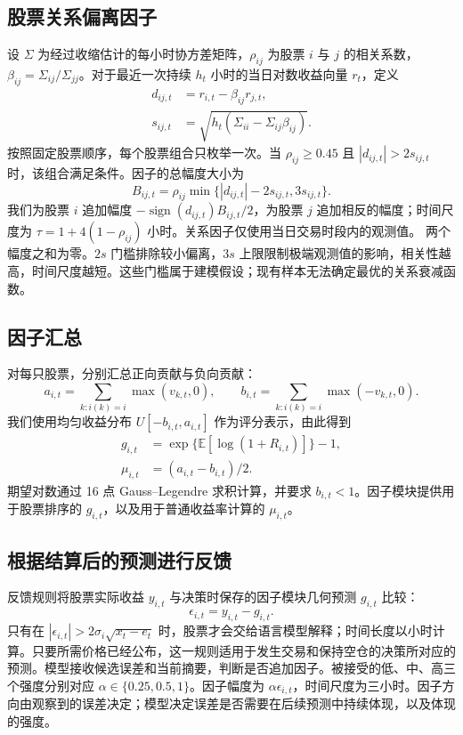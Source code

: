 \documentclass[conference]{IEEEtran}
\begin{document}
\subsection{股票关系偏离因子}
设 $\Sigma$ 为经过收缩估计的每小时协方差矩阵，$\rho_{ij}$ 为股票 $i$ 与 $j$ 的相关系数，$\beta_{ij}=\Sigma_{ij}/\Sigma_{jj}$。对于最近一次持续 $h_t$ 小时的当日对数收益向量 $r_t$，定义
\begin{align}
 d_{ij,t}&=r_{i,t}-\beta_{ij}r_{j,t},\\
 s_{ij,t}&=\sqrt{h_t(\Sigma_{ii}-\Sigma_{ij}\beta_{ij})}.
\end{align}
按照固定股票顺序，每个股票组合只枚举一次。当 $\rho_{ij}\geq0.45$ 且 $|d_{ij,t}|>2s_{ij,t}$ 时，该组合满足条件。因子的总幅度大小为
\begin{equation}
 B_{ij,t}=\rho_{ij}\min\{|d_{ij,t}|-2s_{ij,t},3s_{ij,t}\}.
\end{equation}
我们为股票 $i$ 追加幅度 $-\operatorname{sign}(d_{ij,t})B_{ij,t}/2$，为股票 $j$ 追加相反的幅度；时间尺度为 $\tau=1+4(1-\rho_{ij})$ 小时。关系因子仅使用当日交易时段内的观测值。
两个幅度之和为零。$2s$ 门槛排除较小偏离，$3s$ 上限限制极端观测值的影响，相关性越高，时间尺度越短。这些门槛属于建模假设；现有样本无法确定最优的关系衰减函数。

\subsection{因子汇总}
对每只股票，分别汇总正向贡献与负向贡献：
\begin{equation}
 a_{i,t}=\sum_{k:i(k)=i}\max(v_{k,t},0),\qquad
 b_{i,t}=\sum_{k:i(k)=i}\max(-v_{k,t},0).
\end{equation}
我们使用均匀收益分布 $U[-b_{i,t},a_{i,t}]$ 作为评分表示，由此得到
\begin{align}
 g_{i,t}&=\exp\{\mathbb{E}[\log(1+R_{i,t})]\}-1,\\
 \mu_{i,t}&=(a_{i,t}-b_{i,t})/2.
\end{align}
期望对数通过 16 点 Gauss--Legendre 求积计算，并要求 $b_{i,t}<1$。因子模块提供用于股票排序的 $g_{i,t}$，以及用于普通收益率计算的 $\mu_{i,t}$。

\subsection{根据结算后的预测进行反馈}
反馈规则将股票实际收益 $y_{i,t}$ 与决策时保存的因子模块几何预测 $g_{i,t}$ 比较：
\begin{equation}
 \epsilon_{i,t}=y_{i,t}-g_{i,t}.
\end{equation}
只有在 $|\epsilon_{i,t}|>2\sigma_i\sqrt{x_t-e_t}$ 时，股票才会交给语言模型解释；时间长度以小时计算。只要所需价格已经公布，这一规则适用于发生交易和保持空仓的决策所对应的预测。模型接收候选误差和当前摘要，判断是否追加因子。被接受的低、中、高三个强度分别对应 $\alpha\in\{0.25,0.5,1\}$。因子幅度为 $\alpha\epsilon_{i,t}$，时间尺度为三小时。因子方向由观察到的误差决定；模型决定误差是否需要在后续预测中持续体现，以及体现的强度。
\end{document}
